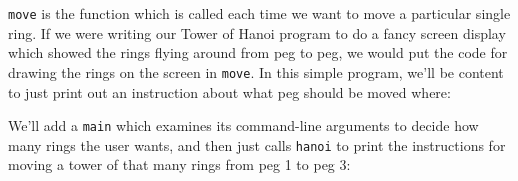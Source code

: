 \begin{flushleft}
\verb%void%
\\* \verb%  hanoi(int num_rings,%
\\* \verb%        int start_peg, %
\\* \verb%        int end_peg)%
\\* \verb%{%
\\* \verb%  int spare_peg = 6 - start_peg - end_peg;%

\verb%  if (num_rings > 0) {%
\\* \verb%    hanoi(num_rings - 1, start_peg, spare_peg);%
\\* \verb%    move(num_rings, start_peg, end_peg);%
\\* \verb%    hanoi(num_rings - 1, spare_peg, end_peg);%
\\* \verb%  }%

\verb%  return;%
\\* \verb%}%
\end{flushleft}

{\tt move} is the function which is called each time we want to move a
particular single ring.  If we were writing our Tower of Hanoi program
to do a fancy screen display which showed the rings flying around from
peg to peg, we would put the code for drawing the rings on the screen in
{\tt move}.  In this simple program, we'll be content to just print out
an instruction about what peg should be moved where:

\begin{flushleft}
\verb%void move(int ring_num, int start, int end)%
\\* \verb%{%
\\* \verb%  printf("Move disk %\verb-%-\verb%d from peg %\verb-%-\verb%d onto peg %\verb-%-\verb%d.\n", %
\\* \verb%         ring_num, start, end);%

\verb%  return;%
\\* \verb%}%
\end{flushleft}

We'll add a {\tt main} which examines its command-line arguments
to decide how many rings the user wants, and then just calls {\tt hanoi}
to print the instructions for moving a tower of that many rings from peg
1 to peg 3:

\begin{flushleft}
\verb%void hanoi(int num_rings, int start_peg, int end_peg);%
\\* \verb%void move(int ring_num, int start, int end);%
\end{flushleft}

